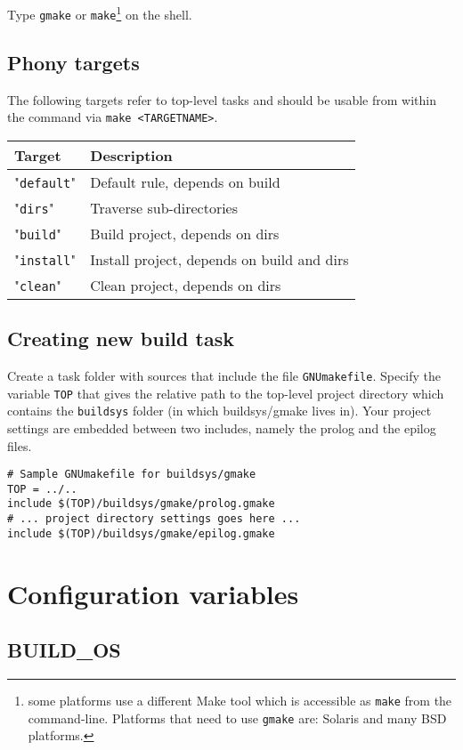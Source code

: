 \documentclass{article}
\newcommand{\var}[1]{{\tt #1}}
\newcommand{\val}[1]{"{\tt #1}"}
\newcommand{\file}[1]{{\tt #1}}
\begin{document}
Type {\tt gmake} or {\tt make}\footnote{some platforms use a different Make tool which is accessible as
{\tt make} from the command-line. Platforms that need to use {\tt gmake} are: Solaris and many BSD platforms.} on the shell.

\subsection{Phony targets}

The following targets refer to top-level tasks and should be usable from within the command via
{\tt make <TARGETNAME>}.

\begin{tabular}{ll}
Target  & Description				\\
\hline
\val{default}	& Default rule, depends on build	\\
\val{dirs}	& Traverse sub-directories		\\
\val{build}	& Build project, depends on dirs	\\
\val{install}	& Install project, depends on build and dirs \\
\val{clean}	& Clean project, depends on dirs	\\
\end{tabular}


\subsection{Creating new build task}

Create a task folder with sources that include the file \file{GNUmakefile}. 
Specify the variable \var{TOP} that gives the relative path to the top-level 
project directory which contains the \file{buildsys} folder (in which buildsys/gmake lives in). 
Your project settings are embedded between
two includes, namely the prolog and the epilog files.

\begin{verbatim}
# Sample GNUmakefile for buildsys/gmake
TOP	= ../..
include $(TOP)/buildsys/gmake/prolog.gmake
# ... project directory settings goes here ...
include $(TOP)/buildsys/gmake/epilog.gmake
\end{verbatim}

\pagebreak
\section{Configuration variables}
  
\subsection{BUILD\_OS}
\end{document}

